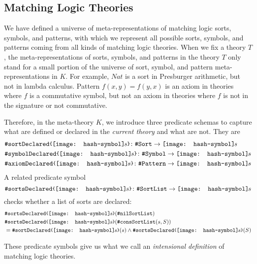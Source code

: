 \documentclass[UTF8,11pt]{article}
\theoremstyle{plain}
\theoremstyle{definition}
\theoremstyle{remark}
\newcommand{\Nat}{\textit{Nat}}
\newcommand{\parametric}[2]{{#1}\raisebox{.2ex}{\texttt{\footnotesize{\{}}}#2\raisebox{.2ex}{\texttt{\footnotesize{\}}}}}
\newcommand{\shp}{\texttt{[image: hash-symbol]}\kern-0.1em}
\newcommand{\sharpsymbol}{\#}
\newcommand{\shs}{\shp s}
\newcommand{\KSort}{\texttt{\sharpsymbol Sort}}
\newcommand{\KSymbol}{\texttt{\sharpsymbol Symbol}}
\newcommand{\KSortList}{\texttt{\sharpsymbol SortList}}
\newcommand{\KnilKSortList}{\texttt{\sharpsymbol nilSortList}}
\newcommand{\KconsKSortList}{\texttt{\sharpsymbol consSortList}}
\newcommand{\KPattern}{\texttt{\sharpsymbol Pattern}}
\newcommand{\KsortDeclared}[1]{
  	\parametric{\texttt{\sharpsymbol sortDeclared}}{#1}}
\newcommand{\KsortsDeclared}[1]{
        \parametric{\texttt{\sharpsymbol sortsDeclared}}{#1}}
\newcommand{\KsymbolDeclared}[1]{
  	\parametric{\texttt{\sharpsymbol symbolDeclared}}{#1}}
\newcommand{\KaxiomDeclared}{\texttt{\sharpsymbol axiomDeclared}}
\begin{document}
\subsection{Matching Logic Theories}
\label{sec:ML-theories}
We have defined a universe of meta-representations of matching logic sorts, 
symbols, and patterns, with which we represent all possible sorts, symbols, and 
patterns coming from all kinds of matching logic theories.
When we fix a theory $T$, the meta-representations of sorts, symbols, and patterns 
in the theory $T$ only stand for a small portion of the universe of sort, 
symbol, and pattern meta-representations in $K$.
For example, $\Nat$ is a sort in Presburger arithmetic, but not in lambda 
calculus.
Pattern $f(x,y) = f(y,x)$ is an axiom in theories where $f$ is a commutative 
symbol, but not an axiom in theories where $f$ is not in the signature or not 
commutative.

Therefore, in the meta-theory $K$, we introduce three predicate schemas to 
capture what are defined or declared in the \emph{current theory} and what are 
not.
They are
\begin{align*}
& \KsortDeclared{\shs} \colon \KSort \to \shs \\
& \KsymbolDeclared{\shs} \colon \KSymbol \to \shs \\
& \parametric{\KaxiomDeclared}{\shs} \colon \KPattern \to \shs
\end{align*}
A related predicate symbol
\begin{equation}
	\KsortsDeclared{\shs} \colon \KSortList \to \shs
\end{equation}
checks whether a list of sorts are declared:
\begin{align*}
& \KsortsDeclared{\shs}(\KnilKSortList) \\
& \KsortsDeclared{\shs}(\KconsKSortList(s,S)) \\
& = \KsortDeclared{\shs}(s) \wedge \KsortsDeclared{\shs}(S)
\end{align*}

These predicate symbols give us what we call an \emph{intensional definition} 
of matching logic 
theories.
\end{document}
